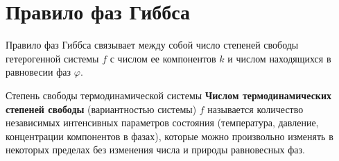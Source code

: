 \documentclass[12pt,a4paper]{article}
\begin{document}
\section{Правило фаз Гиббса}
\label{sec:phase_rule}

Правило фаз Гиббса связывает между собой число степеней свободы гетерогенной системы $f$ с числом ее компонентов $k$ и числом находящихся в равновесии фаз $\varphi$.

\begin{defbox}{Степень свободы термодинамической системы}
\textbf{Числом термодинамических степеней свободы} (вариантностью системы) $f$ называется количество независимых интенсивных параметров состояния (температура, давление, концентрации компонентов в фазах), которые можно произвольно изменять в некоторых пределах без изменения числа и природы равновесных фаз.
\end{defbox}
\end{document}
